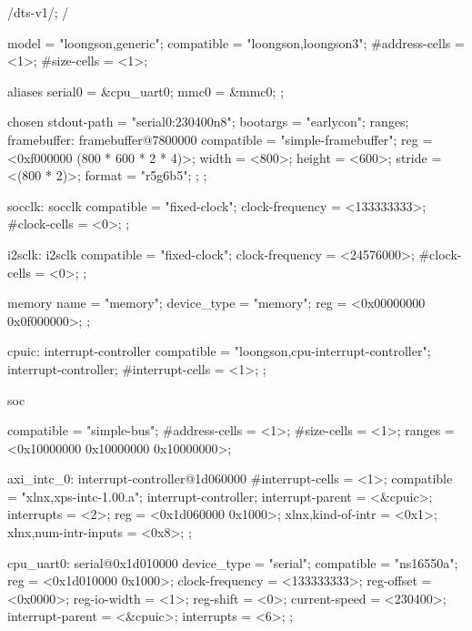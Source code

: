 \begin{CodeBlock}[language=BookDTS]
/dts-v1/;
/{
    model = "loongson,generic";
    compatible = "loongson,loongson3";
    #address-cells = <1>;
    #size-cells = <1>;

    aliases {
        serial0 = &cpu_uart0;
        mmc0 = &mmc0;
    };

    chosen {
        stdout-path = "serial0:230400n8";
        bootargs = "earlycon";
        ranges;
        framebuffer: framebuffer@7800000 {
            compatible = "simple-framebuffer";
            reg = <0xf000000 (800 * 600 * 2 * 4)>;
            width = <800>;
            height = <600>;
            stride = <(800 * 2)>;
            format = "r5g6b5";
        }; 
    };

    socclk: socclk {
        compatible = "fixed-clock";
        clock-frequency = <133333333>;
        #clock-cells = <0>;
    };

    i2sclk: i2sclk {
        compatible = "fixed-clock";
        clock-frequency = <24576000>;
        #clock-cells = <0>;
    };

    memory {
        name = "memory";
        device_type = "memory";
        reg =  <0x00000000  0x0f000000>;
    };

    cpuic: interrupt-controller {
        compatible = "loongson,cpu-interrupt-controller";
        interrupt-controller;
        #interrupt-cells = <1>;
    };

    soc {
        compatible = "simple-bus";
        #address-cells = <1>;
        #size-cells = <1>;
        ranges = <0x10000000 0x10000000 0x10000000>;

        axi_intc_0: interrupt-controller@1d060000 {
                #interrupt-cells = <1>;
                compatible = "xlnx,xps-intc-1.00.a";
                interrupt-controller;
                interrupt-parent = <&cpuic>;
                interrupts = <2>;
                reg = <0x1d060000 0x1000>;
                xlnx,kind-of-intr = <0x1>;
                xlnx,num-intr-inputs = <0x8>;
        };

        cpu_uart0: serial@0x1d010000 {
            device_type = "serial";
            compatible = "ns16550a";
            reg = <0x1d010000 0x1000>;
            clock-frequency = <133333333>;
            reg-offset = <0x0000>;
            reg-io-width = <1>;
            reg-shift = <0>;
            current-speed = <230400>;
            interrupt-parent = <&cpuic>;
            interrupts = <6>;
        };

}}
\end{CodeBlock}
